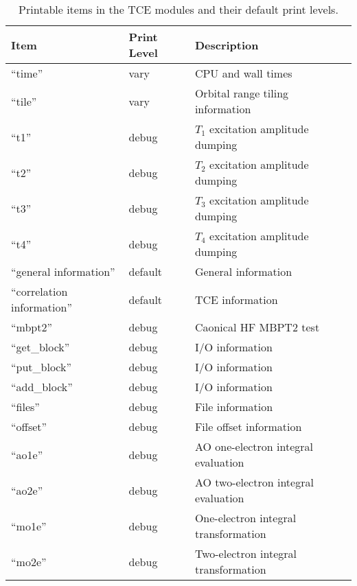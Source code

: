 \begin{table}[htbp]
\begin{center}
\caption{Printable items in the TCE modules and their default print levels.}
\label{tbl:tce-printable}
\begin{tabular}{lll}
\hline\hline
Item                     & Print Level   & Description \\
\hline 
``time''                 & vary          & CPU and wall times \\
``tile''                 & vary          & Orbital range tiling information \\
``t1''                   & debug         & $T_1$ excitation amplitude dumping \\
``t2''                   & debug         & $T_2$ excitation amplitude dumping \\
``t3''                   & debug         & $T_3$ excitation amplitude dumping \\
``t4''                   & debug         & $T_4$ excitation amplitude dumping \\
``general information''  & default       & General information \\
``correlation information''       & default       & TCE information \\
``mbpt2''                & debug         & Caonical HF MBPT2 test \\
``get\_block''            & debug         & I/O information \\
``put\_block''            & debug         & I/O information \\
``add\_block''            & debug         & I/O information \\
``files''                & debug         & File information \\
``offset''               & debug         & File offset information \\
``ao1e''                 & debug         & AO one-electron integral evaluation \\
``ao2e''                 & debug         & AO two-electron integral evaluation \\
``mo1e''                 & debug         & One-electron integral transformation \\
``mo2e''                 & debug         & Two-electron integral transformation \\
\hline\hline
\end{tabular}
\end{center}
\end{table}

